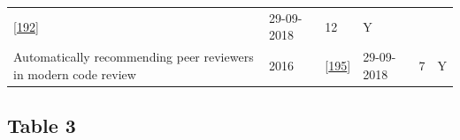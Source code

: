 \documentclass[]{book}
\begin{document}
\begin{longtable}[]{@{}llllll@{}}
\begin{minipage}[t]{0.13\columnwidth}
{[}\protect\hyperlink{ref-yang2016mining}{192}{]}\strut
\end{minipage} & \begin{minipage}[t]{0.06\columnwidth}\raggedright\strut
29-09-2018\strut
\end{minipage} & \begin{minipage}[t]{0.07\columnwidth}\raggedright\strut
12\strut
\end{minipage} & \begin{minipage}[t]{0.08\columnwidth}\raggedright\strut
Y\strut
\end{minipage}\tabularnewline
\begin{minipage}[t]{0.47\columnwidth}\raggedright\strut
Automatically recommending peer reviewers in modern code review\strut
\end{minipage} & \begin{minipage}[t]{0.03\columnwidth}\raggedright\strut
2016\strut
\end{minipage} & \begin{minipage}[t]{0.13\columnwidth}\raggedright\strut
{[}\protect\hyperlink{ref-zanjani2016automatically}{195}{]}\strut
\end{minipage} & \begin{minipage}[t]{0.06\columnwidth}\raggedright\strut
29-09-2018\strut
\end{minipage} & \begin{minipage}[t]{0.07\columnwidth}\raggedright\strut
7\strut
\end{minipage} & \begin{minipage}[t]{0.08\columnwidth}\raggedright\strut
Y\strut
\end{minipage}\tabularnewline
\bottomrule
\end{longtable}

\subsection{Table 3}\label{table-3}
\end{document}
